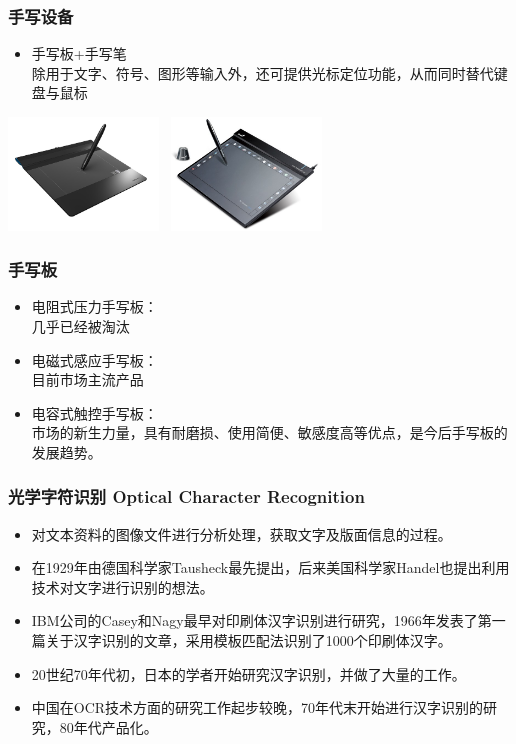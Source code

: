 \documentclass{beamer}
\begin{document}
\begin{frame}
	\frametitle{手写设备}
	\begin{itemize}
		\item 手写板+手写笔\\
		{\tiny 除用于文字、符号、图形等输入外，还可提供光标定位功能，从而同时替代键盘与鼠标}
	\end{itemize}
	\begin{center}
		\includegraphics[width=4cm]{images/drawing-pad-hanwang.jpg}~
		\includegraphics[width=4cm]{images/drawing-pad-mengtian.jpg}
	\end{center}
\end{frame}

\begin{frame}
	\frametitle{手写板}
	\begin{itemize}
		\item 电阻式压力手写板：\\{\tiny 几乎已经被淘汰}
		\item 电磁式感应手写板：\\{\tiny 目前市场主流产品}
		\item 电容式触控手写板：\\{\tiny 市场的新生力量，具有耐磨损、使用简便、敏感度高等优点，是今后手写板的发展趋势。}
	\end{itemize}
\end{frame}

\begin{frame}
	\frametitle{光学字符识别 Optical Character Recognition}
	\beamertemplatetransparentcovereddynamicmedium
	\begin{itemize}[<+->]
		\item 对文本资料的图像文件进行分析处理，获取文字及版面信息的过程。
		\item 在1929年由德国科学家Tausheck最先提出，后来美国科学家Handel也提出利用技术对文字进行识别的想法。
		\item IBM公司的Casey和Nagy最早对印刷体汉字识别进行研究，1966年发表了第一篇关于汉字识别的文章\cite{casey1966recognition}，采用模板匹配法识别了1000个印刷体汉字。
		\item 20世纪70年代初，日本的学者开始研究汉字识别，并做了大量的工作。
		\item 中国在OCR技术方面的研究工作起步较晚，70年代末开始进行汉字识别的研究，80年代产品化。
	\end{itemize}
\end{frame}
\end{document}
